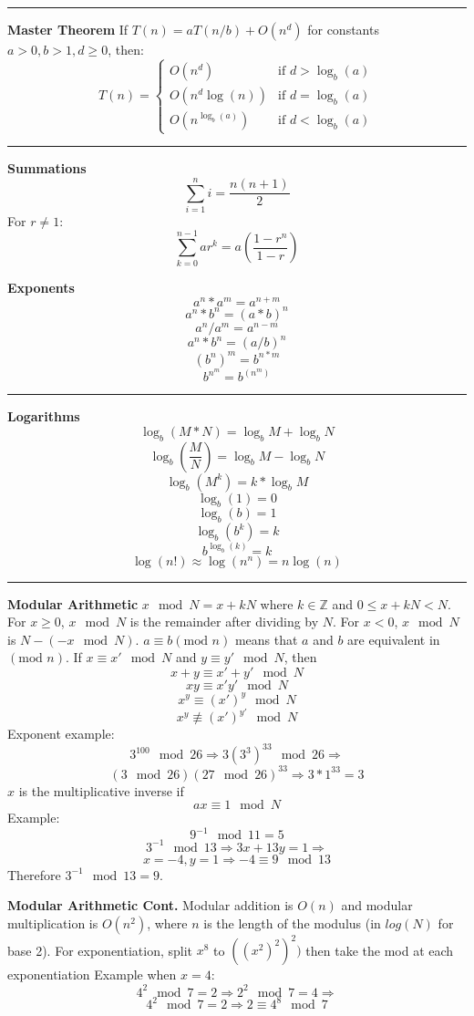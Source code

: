 \documentclass[9pt]{amsart}
\begin{document}
\begin{multicols*}{3}
  \vskip 7pt
  \hrule
  \vskip 7pt
  
  \textbf{Master Theorem}
  \newline
  If $T(n) = aT(n/b) + O(n^d)$ for constants $a > 0, b > 1, d \geq 0$, then:
  $$
  T(n) = 
  \begin{cases}
    O(n^d) & \text{if } d > \log_b(a) \\
    O(n^d \log(n)) & \text{if } d = \log_b(a) \\
    O(n^{\log_b(a)}) & \text{if } d < \log_b(a)
  \end{cases}
  $$

  \vskip 7pt
  \hrule
  \vskip 7pt

  \textbf{Summations}
  $$
  \sum^n_{i=1} i = \frac{n(n+1)}{2}
  $$
  For $r \neq 1$:
  $$
  \sum^{n-1}_{k=0} ar^k = a(\frac{1 - r^n}{1 - r})
  $$

  \textbf{Exponents}
  $$a^n * a^m = a^{n+m}$$
  $$a^n * b^n = (a * b)^n$$
  $$a^n / a^m = a^{n-m}$$
  $$a^n * b^n = (a / b)^n$$
  $$(b^n)^m = b^{n*m}$$
  $$b^{n^m} = b^{(n^m)}$$

  \vskip 7pt
  \hrule
  \vskip 7pt

  \textbf{Logarithms}
  $$\log_b(M * N) = \log_b M + \log_b N$$
  $$\log_b(\frac{M}{N}) = \log_b M - \log_b N$$
  $$\log_b(M^k) = k * \log_b M$$
  $$\log_b(1) = 0$$
  $$\log_b(b) = 1$$
  $$\log_b(b^k) = k$$
  $$b^{\log_b(k)} = k$$
  $$\log(n!) \approx \log(n^n) = n\log(n)$$

  \vskip 7pt
  \hrule
  \vskip 7pt

  \textbf{Modular Arithmetic}
  \newline
  $x \mod N = x + kN$ where $k \in \mathbb{Z}$ and $0 \leq x + kN < N$.
  \vskip 3pt
  For $x \geq 0$, $x \mod N$ is the remainder after dividing by $N$. For $x < 0$,
  $x \mod N$ is $N - (-x \mod N)$.
  \vskip 3pt
  $a \equiv b (\text{mod } n)$ means that $a$ and $b$ are equivalent in 
  $(\text{mod } n)$.
  \vskip 3pt
  If $x \equiv x' \mod N$ and $y \equiv y' \mod N$, then
  $$x + y \equiv x' + y' \mod N$$
  $$xy \equiv x'y' \mod N$$
  $$x^y \equiv (x')^y \mod N$$
  $$x^y \not\equiv (x')^{y'} \mod N$$ 
  Exponent example:
  $$3^{100} \mod 26 \Rightarrow 3(3^3)^{33} \mod 26 \Rightarrow$$
  $$(3 \mod 26)(27 \mod 26)^{33} \Rightarrow 3 * 1^{33} = 3$$
  $x$ is the multiplicative inverse if
  $$ax \equiv 1 \mod N$$
  Example:
  $$9^{-1} \mod 11 = 5$$
  $$3^{-1} \mod 13 \Rightarrow 3x + 13y = 1 \Rightarrow$$
  $$x = -4, y = 1 \Rightarrow -4 \equiv 9 \mod 13$$
  Therefore $3^{-1} \mod 13 = 9$.

  \textbf{Modular Arithmetic Cont.}
  \newline
  Modular addition is $O(n)$ and modular multiplication is $O(n^2)$, where $n$ is the
  length of the modulus (in $log(N)$ for base 2). 
  \newline
  For exponentiation, split $x^8$ to
  $((x^2)^2)^2)$ then take the mod at each exponentiation 
  \newline
  Example when $x = 4$: 
  $$4^2 \mod 7 = 2 \Rightarrow 2^2 \mod 7 = 4 \Rightarrow$$
  $$4^2 \mod 7 = 2 \Rightarrow 2 \equiv 4^8 \mod 7$$


\end{multicols*}
\end{document}
